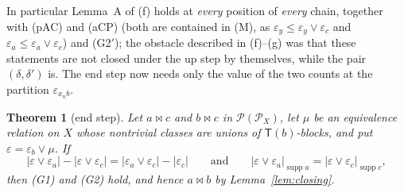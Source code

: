 \documentclass[11pt]{amsart}
\newtheorem{theorem}{Theorem}[section]
\theoremstyle{definition}
\renewcommand{\P}{\mathcal{P}}
\newcommand{\supp}{\operatorname{supp}}
\newcommand{\T}{\mathsf{T}}
\newcommand{\mt}{\bowtie}   %
\begin{document}
In particular Lemma~A of (f) holds at \emph{every} position of \emph{every} chain, together with (pAC) and (aCP) (both are contained in (M), as $\varepsilon_y\le\varepsilon_y\vee\varepsilon_c$ and $\varepsilon_a\le\varepsilon_a\vee\varepsilon_c$) and (G2$'$); the obstacle described in (f)--(g) was that these statements are not closed under the up step by themselves, while the pair $(\delta,\delta')$ is. The end step now needs only the value of the two counts at the partition $\varepsilon_{x_nb}$.

\begin{theorem}[end step]\label{thm:endstep}
Let $a\mt c$ and $b\mt c$ in $\P(\P_X)$, let $\mu$ be an equivalence relation on $X$ whose nontrivial classes are unions of $\T(b)$-blocks, and put $\varepsilon=\varepsilon_b\vee\mu$. If
\[
|\varepsilon\vee\varepsilon_a|-|\varepsilon\vee\varepsilon_c|=|\varepsilon_a\vee\varepsilon_c|-|\varepsilon_c|
\qquad\text{and}\qquad
|\varepsilon\vee\varepsilon_a|_{\supp a}=|\varepsilon\vee\varepsilon_c|_{\supp c},
\]
then \textup{(G1)} and \textup{(G2)} hold, and hence $a\mt b$ by Lemma~\ref{lem:closing}.
\end{theorem}
\end{document}
